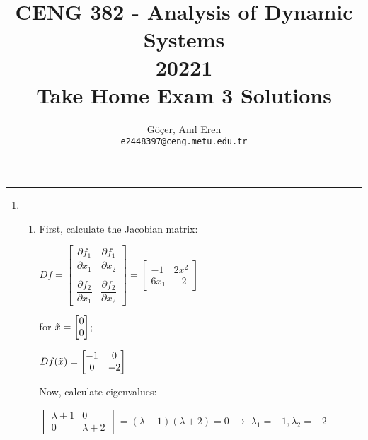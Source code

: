\documentclass[12pt,a4paper, margin=1in]{article}
\author{
  Göçer, Anıl Eren\\
  \texttt{e2448397@ceng.metu.edu.tr}
}
\title{CENG 382 - Analysis of Dynamic Systems \\
20221\\
Take Home Exam 3 Solutions}
\begin{document}
\maketitle

\noindent\rule{19cm}{1.2pt}

\begin{enumerate}

    \item %
        \begin{enumerate}
            \item First, calculate the Jacobian matrix: \\
            \begin{center}
                $Df = \begin{bmatrix}
                    \dfrac{\partial f_1}{\partial x_1} & \dfrac{\partial f_1}{\partial x_2} \\ \\
                    \dfrac{\partial f_2}{\partial x_1} & \dfrac{\partial f_2}{\partial x_2}
                \end{bmatrix} = \begin{bmatrix}
                    -1 & 2x^2 \\
                    6x_1 & -2
                \end{bmatrix}$
            \end{center}

            for $\Tilde{x} = \begin{bmatrix}
                0 \\ 0
            \end{bmatrix}$;
            \begin{center}
                $Df(\Tilde{x}) = \begin{bmatrix}
                    -1 & 0 \\
                    0 & -2
                \end{bmatrix}$
            \end{center}

            Now, calculate eigenvalues: \\
            \begin{center}
                $\begin{vmatrix}
                    \lambda + 1 & 0 \\
                    0 & \lambda + 2
                \end{vmatrix} = (\lambda + 1 )(\lambda + 2)=0$ \space \space $\longrightarrow $ \space \space $\lambda_1 = -1, \lambda_2 = -2$
            \end{center}


\end{enumerate}
\end{enumerate}
\end{document}
